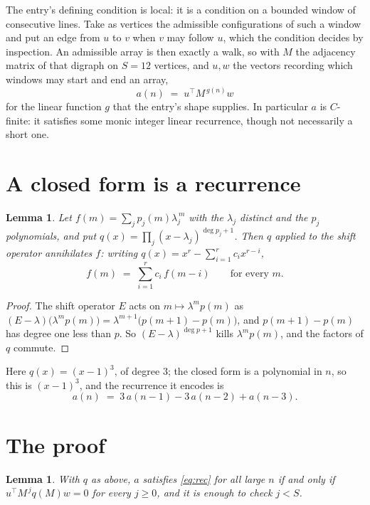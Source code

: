\documentclass[11pt,a4paper]{article}
\theoremstyle{plain}
\newtheorem{lemma}[theorem]{Lemma}
\theoremstyle{definition}
\begin{document}
The entry's defining condition is local: it is a condition on a bounded window of consecutive lines. Take as vertices the
admissible configurations of such a window and put an edge from $u$ to $v$ when $v$ may
follow $u$, which the condition decides by inspection. An admissible array is then exactly a
walk, so with $M$ the adjacency matrix of that digraph on $S=12$ vertices, and $u,w$ the
vectors recording which windows may start and end an array,
\[
a(n)\;=\;u^{\!\top}M^{\,g(n)}w
\]
for the linear function $g$ that the entry's shape supplies. In particular $a$ is
$C$-finite: it satisfies some monic integer linear recurrence, though not necessarily a short
one.

\section{A closed form is a recurrence}

\begin{lemma}\label{lem:ann}
Let $f(m)=\sum_{j}p_j(m)\lambda_j^{\,m}$ with the $\lambda_j$ distinct and the $p_j$
polynomials, and put $q(x)=\prod_j(x-\lambda_j)^{\deg p_j+1}$. Then $q$ applied to the shift
operator annihilates $f$: writing $q(x)=x^{r}-\sum_{i=1}^{r}c_ix^{r-i}$,
\[
f(m)\;=\;\sum_{i=1}^{r}c_i\,f(m-i)\qquad\text{for every }m.
\]
\end{lemma}

\begin{proof}
The shift operator $E$ acts on $m\mapsto\lambda^{m}p(m)$ as
$(E-\lambda)\bigl(\lambda^{m}p(m)\bigr)=\lambda^{m+1}\bigl(p(m+1)-p(m)\bigr)$, and
$p(m+1)-p(m)$ has degree one less than $p$. So $(E-\lambda)^{\deg p+1}$ kills
$\lambda^{m}p(m)$, and the factors of $q$ commute.
\end{proof}

Here $q(x)=(x-1)^{3}$, of degree $3$; the closed form is a polynomial in $n$, so this is $(x-1)^{3}$, and the recurrence it encodes is
\begin{equation}\label{eq:rec}
a(n)\;=\;3\,a(n-1) - 3\,a(n-2) + a(n-3).
\end{equation}

\section{The proof}

\begin{lemma}\label{lem:crit}
With $q$ as above, $a$ satisfies \eqref{eq:rec} for all large $n$ if and only if
$u^{\!\top}M^{\,j}q(M)w=0$ for every $j\ge0$, and it is enough to check $j<S$.
\end{lemma}
\end{document}
